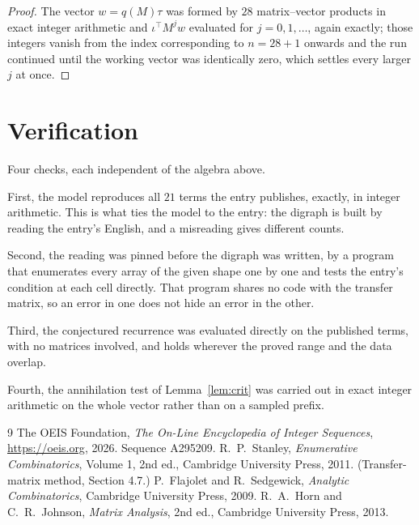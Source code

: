 \documentclass[11pt,a4paper]{article}
\theoremstyle{plain}
\theoremstyle{definition}
\begin{document}
\begin{proof}
The vector $w=q(M)\tau$ was formed by $28$ matrix--vector products in exact integer
arithmetic and $\iota^{\!\top}M^{j}w$ evaluated for $j=0,1,\dots$, again exactly; those
integers vanish from the index corresponding to $n=28+1$ onwards and the run continued
until the working vector was identically zero, which settles every larger $j$ at once.
\end{proof}

\section{Verification}

Four checks, each independent of the algebra above.

First, the model reproduces all $21$ terms the entry publishes, exactly, in integer
arithmetic. This is what ties the model to the entry: the digraph is built by reading the
entry's English, and a misreading gives different counts.

Second, the reading was pinned before the digraph was written, by a program that enumerates
every array of the given shape one by one and tests the entry's condition at each cell
directly. That program shares no code with the transfer matrix, so an error in one does not
hide an error in the other.

Third, the conjectured recurrence was evaluated directly on the published terms, with no
matrices involved, and holds wherever the proved range and the data overlap.

Fourth, the annihilation test of Lemma~\ref{lem:crit} was carried out in exact integer
arithmetic on the whole vector rather than on a sampled prefix.

\begin{thebibliography}{9}
 The OEIS Foundation, \emph{The On-Line Encyclopedia of Integer
Sequences}, \url{https://oeis.org}, 2026. Sequence A295209.
 R.~P.~Stanley, \emph{Enumerative Combinatorics}, Volume 1, 2nd ed.,
Cambridge University Press, 2011. (Transfer-matrix method, Section 4.7.)
 P.~Flajolet and R.~Sedgewick, \emph{Analytic Combinatorics}, Cambridge
University Press, 2009.
 R.~A.~Horn and C.~R.~Johnson, \emph{Matrix Analysis}, 2nd ed., Cambridge
University Press, 2013.
\end{thebibliography}
\end{document}
